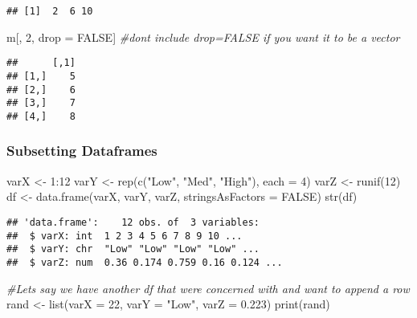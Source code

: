 \documentclass[
]{article}
\newenvironment{Shaded}{\begin{snugshade}}{\end{snugshade}}
\newcommand{\AttributeTok}[1]{\textcolor[rgb]{0.77,0.63,0.00}{#1}}
\newcommand{\CommentTok}[1]{\textcolor[rgb]{0.56,0.35,0.01}{\textit{#1}}}
\newcommand{\ConstantTok}[1]{\textcolor[rgb]{0.00,0.00,0.00}{#1}}
\newcommand{\DecValTok}[1]{\textcolor[rgb]{0.00,0.00,0.81}{#1}}
\newcommand{\FloatTok}[1]{\textcolor[rgb]{0.00,0.00,0.81}{#1}}
\newcommand{\FunctionTok}[1]{\textcolor[rgb]{0.00,0.00,0.00}{#1}}
\newcommand{\NormalTok}[1]{#1}
\newcommand{\OtherTok}[1]{\textcolor[rgb]{0.56,0.35,0.01}{#1}}
\newcommand{\SpecialCharTok}[1]{\textcolor[rgb]{0.00,0.00,0.00}{#1}}
\newcommand{\StringTok}[1]{\textcolor[rgb]{0.31,0.60,0.02}{#1}}
\begin{document}
\begin{verbatim}
## [1]  2  6 10
\end{verbatim}

\begin{Shaded}
\begin{Highlighting}[]
\NormalTok{m[, }\DecValTok{2}\NormalTok{, drop }\OtherTok{=} \ConstantTok{FALSE}\NormalTok{]  }\CommentTok{\#don\textquotesingle{}t include drop=FALSE if you want it to be a vector}
\end{Highlighting}
\end{Shaded}

\begin{verbatim}
##      [,1]
## [1,]    5
## [2,]    6
## [3,]    7
## [4,]    8
\end{verbatim}

\hypertarget{subsetting-dataframes}{%
\subsubsection{Subsetting Dataframes}\label{subsetting-dataframes}}

\begin{Shaded}
\begin{Highlighting}[]
\NormalTok{varX }\OtherTok{\textless{}{-}} \DecValTok{1}\SpecialCharTok{:}\DecValTok{12}
\NormalTok{varY }\OtherTok{\textless{}{-}} \FunctionTok{rep}\NormalTok{(}\FunctionTok{c}\NormalTok{(}\StringTok{"Low"}\NormalTok{, }\StringTok{"Med"}\NormalTok{, }\StringTok{"High"}\NormalTok{), }\AttributeTok{each =} \DecValTok{4}\NormalTok{)}
\NormalTok{varZ }\OtherTok{\textless{}{-}} \FunctionTok{runif}\NormalTok{(}\DecValTok{12}\NormalTok{)}
\NormalTok{df }\OtherTok{\textless{}{-}} \FunctionTok{data.frame}\NormalTok{(varX, varY, varZ, }\AttributeTok{stringsAsFactors =} \ConstantTok{FALSE}\NormalTok{)}
\FunctionTok{str}\NormalTok{(df)}
\end{Highlighting}
\end{Shaded}

\begin{verbatim}
## 'data.frame':    12 obs. of  3 variables:
##  $ varX: int  1 2 3 4 5 6 7 8 9 10 ...
##  $ varY: chr  "Low" "Low" "Low" "Low" ...
##  $ varZ: num  0.36 0.174 0.759 0.16 0.124 ...
\end{verbatim}

\begin{Shaded}
\begin{Highlighting}[]
\CommentTok{\#Let\textquotesingle{}s say we have another df that we\textquotesingle{}re concerned with and want to append a row}
\NormalTok{rand }\OtherTok{\textless{}{-}} \FunctionTok{list}\NormalTok{(}\AttributeTok{varX =} \DecValTok{22}\NormalTok{, }\AttributeTok{varY =} \StringTok{"Low"}\NormalTok{, }\AttributeTok{varZ =} \FloatTok{0.223}\NormalTok{)}
\FunctionTok{print}\NormalTok{(rand)}
\end{Highlighting}
\end{Shaded}
\end{document}
